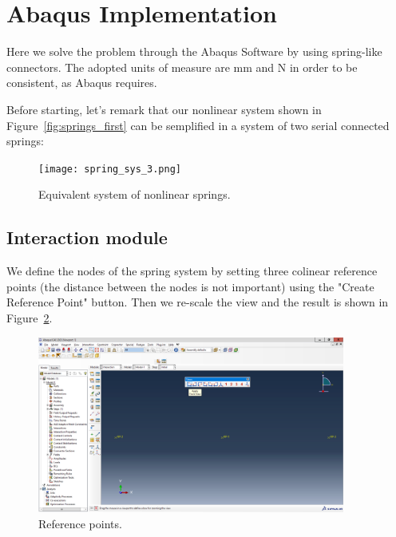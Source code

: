 \newpage

\section{Abaqus Implementation}
\label{sec:abaqus_implementation1}%

Here we solve the problem through the Abaqus Software by using spring-like connectors. The adopted units of measure are mm and N in order to be consistent, as Abaqus requires.

Before starting, let's remark that our nonlinear system shown in Figure~\ref{fig:springs_first} can be semplified in a system of two serial connected springs:
\begin{figure}[H]
    \centering
    \texttt{[image: spring\_sys\_3.png]}
    \caption{Equivalent system of nonlinear springs.}
    \label{fig:springs_second}
\end{figure}

\subsection{Interaction module}
\label{interaction_module1}%

We define the nodes of the spring system by setting three colinear reference points (the distance between the nodes is not important) using the "Create Reference Point" button. Then we re-scale the view and the result is shown in Figure~\ref{fig:a2}.
\begin{figure}[H]
    \centering
    \includegraphics[width=0.9\textwidth]{Images/ab1/a2.png}
    \caption{Reference points.}
    \label{fig:a2}
\end{figure}

\newpage

